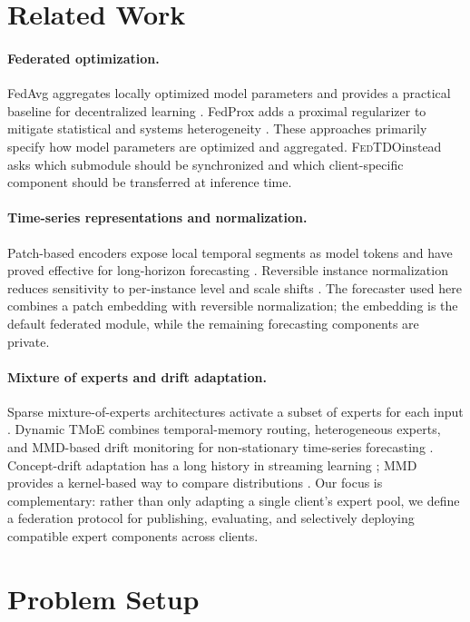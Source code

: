 \documentclass{article}
\newcommand{\method}{\textsc{FedTDO}}
\theoremstyle{definition}
\begin{document}
\section{Related Work}

\paragraph{Federated optimization.}
FedAvg aggregates locally optimized model parameters and provides a practical baseline for decentralized learning \citep{mcmahan2017communication}. FedProx adds a proximal regularizer to mitigate statistical and systems heterogeneity \citep{li2020federated}. These approaches primarily specify how model parameters are optimized and aggregated. \method instead asks which submodule should be synchronized and which client-specific component should be transferred at inference time.

\paragraph{Time-series representations and normalization.}
Patch-based encoders expose local temporal segments as model tokens and have proved effective for long-horizon forecasting \citep{nie2023time}. Reversible instance normalization reduces sensitivity to per-instance level and scale shifts \citep{kim2022reversible}. The forecaster used here combines a patch embedding with reversible normalization; the embedding is the default federated module, while the remaining forecasting components are private.

\paragraph{Mixture of experts and drift adaptation.}
Sparse mixture-of-experts architectures activate a subset of experts for each input \citep{shazeer2017outrageously}. Dynamic TMoE combines temporal-memory routing, heterogeneous experts, and MMD-based drift monitoring for non-stationary time-series forecasting \citep{zhu2026dynamictmoe}. Concept-drift adaptation has a long history in streaming learning \citep{gama2014survey}; MMD provides a kernel-based way to compare distributions \citep{gretton2012kernel}. Our focus is complementary: rather than only adapting a single client's expert pool, we define a federation protocol for publishing, evaluating, and selectively deploying compatible expert components across clients.

\section{Problem Setup}
\end{document}
